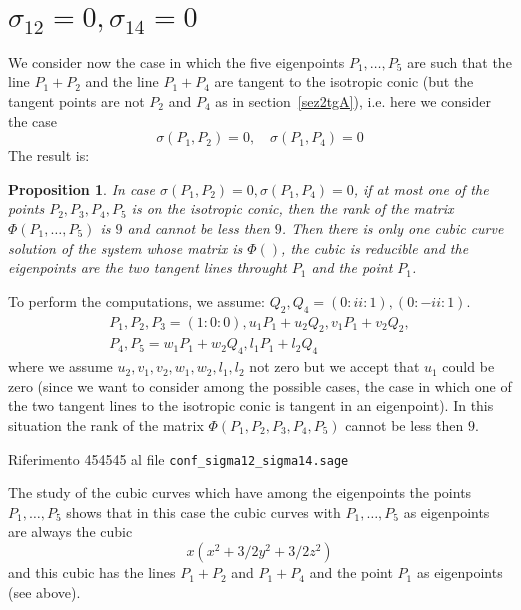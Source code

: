 \documentclass[10pt, a4paper, reqno, captions=tableheading,bibliography=totoc]{scrartcl}
\theoremstyle{plain}
\newtheorem{prop}[lemma]{Proposition}
\theoremstyle{definition}
\begin{document}
\section{$\sigma_{12} = 0, \sigma_{14} = 0$}
We consider now the case in which the five eigenpoints $P_1, \dots, P_5$
are such that the line $P_1+P_2$ and the line $P_1+P_4$ are tangent to the
isotropic conic (but the tangent points are not $P_2$ and $P_4$ as in
section~\ref{sez2tgA}), i.e. here we consider the case
\[
\sigma(P_1, P_2) = 0, \quad \sigma(P_1, P_4) = 0
\]
The result is:
\begin{prop}
In case $\sigma(P_1, P_2) = 0, \sigma(P_1, P_4) = 0$, if at most 
one of the points $P_2, P_3, P_4, P_5$ is on the isotropic conic, then
the rank of the matrix $\Phi(P_1, \dots, P_5)$ is $9$ and cannot be
less then $9$. Then there is only one cubic curve solution of the system
whose matrix is $\Phi()$, the cubic is reducible and the eigenpoints are
the two tangent lines throught $P_1$ and the point $P_1$.
\end{prop}

To perform the computations, we assume:
$Q_2, Q_4 = (0: \mathit{ii}: 1), (0: -\mathit{ii}: 1)$.
\begin{gather}
P_1, P_2, P_3 = (1:0:0), u_1P_1+u_2Q_2, v_1P_1+v_2Q_2, \nonumber \\
P_4, P_5 = w_1P_1+w_2Q_4, l_1P_1+l_2Q_4\nonumber
\end{gather}
where we assume $u_2, v_1, v_2, w_1, w_2, l_1, l_2$ not zero but we accept
that $u_1$ could be zero (since we want to consider among the possible
cases, the case in which one of the two tangent lines to the isotropic
conic is tangent in an eigenpoint). In this situation the rank of the
matrix $\Phi(P_1, P_2, P_3, P_4, P_5)$ cannot be less then $9$.

Riferimento 454545 al file \verb+conf_sigma12_sigma14.sage+

The study of the cubic curves which have among the eigenpoints
the points $P_1, \dots, P_5$ shows that in this case the cubic curves
with $P_1, \dots, P_5$ as eigenpoints are always the cubic
\[
x(x^2 + 3/2y^2 + 3/2z^2)
\]
and this cubic has the lines $P_1+P_2$ and $P_1+P_4$ and the point $P_1$ as
eigenpoints (see above). 
\end{document}
